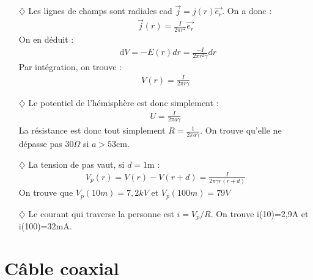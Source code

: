 \documentclass{report}
\newcommand*\dif{\mathop{}\!\mathrm{d}}
\begin{document}
\begin{itemize}

	\item[$\diamondsuit$] Les lignes de champs sont radiales cad $\vec{j}=j(r)\vec{e_r}$. On a donc :
\begin{align*}
	\vec{j}(r)=\frac{I}{2\pi r^2}\vec{e_r}
\end{align*}
On en déduit :
\begin{align*}
	\dif V=-E(r)dr=\frac{-I}{2\pi r^2\gamma}dr
\end{align*}
Par intégration, on trouve :
\begin{align*}
	V(r)=\frac{I}{2\pi r\gamma}
\end{align*}

	\item[$\diamondsuit$] Le potentiel de l'hémisphère est donc simplement :
\begin{align*}
	U=\frac{I}{2\pi a\gamma}
\end{align*}
La résistance est donc tout simplement $R=\frac{1}{2\pi a \gamma}$. On trouve qu'elle ne dépasse pas 30$\Omega$ si $a>53$cm.

	\item[$\diamondsuit$] La tension de pas vaut, si $d=1$m :
	\begin{align*}
		V_p(r)=V(r)-V(r+d)=\frac{I}{2\pi \gamma r(r+d)}
	\end{align*}
On trouve que $V_p(10m)=7,2kV$ et  $V_p(100m)=79V$

	\item[$\diamondsuit$] Le courant qui traverse la personne est $i=V_p/R$. On trouve i(10)=2,9A et i(100)=32mA.
\end{itemize}

\section*{Câble coaxial}
\end{document}
